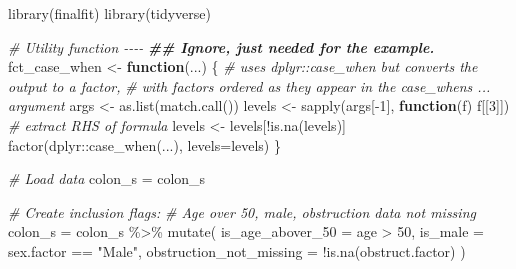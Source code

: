 \documentclass[
]{book}
\newenvironment{Shaded}{\begin{snugshade}}{\end{snugshade}}
\newcommand{\AttributeTok}[1]{\textcolor[rgb]{0.77,0.63,0.00}{#1}}
\newcommand{\CommentTok}[1]{\textcolor[rgb]{0.56,0.35,0.01}{\textit{#1}}}
\newcommand{\ControlFlowTok}[1]{\textcolor[rgb]{0.13,0.29,0.53}{\textbf{#1}}}
\newcommand{\DecValTok}[1]{\textcolor[rgb]{0.00,0.00,0.81}{#1}}
\newcommand{\DocumentationTok}[1]{\textcolor[rgb]{0.56,0.35,0.01}{\textbf{\textit{#1}}}}
\newcommand{\FunctionTok}[1]{\textcolor[rgb]{0.00,0.00,0.00}{#1}}
\newcommand{\NormalTok}[1]{#1}
\newcommand{\OtherTok}[1]{\textcolor[rgb]{0.56,0.35,0.01}{#1}}
\newcommand{\SpecialCharTok}[1]{\textcolor[rgb]{0.00,0.00,0.00}{#1}}
\newcommand{\StringTok}[1]{\textcolor[rgb]{0.31,0.60,0.02}{#1}}
\begin{document}
\begin{Shaded}
\begin{Highlighting}[]
\FunctionTok{library}\NormalTok{(finalfit)}
\FunctionTok{library}\NormalTok{(tidyverse)}

\CommentTok{\# Utility function {-}{-}{-}{-}}
\DocumentationTok{\#\# Ignore, just needed for the example. }
\NormalTok{fct\_case\_when }\OtherTok{\textless{}{-}} \ControlFlowTok{function}\NormalTok{(...) \{}
  \CommentTok{\# uses dplyr::case\_when but converts the output to a factor,}
  \CommentTok{\# with factors ordered as they appear in the case\_when\textquotesingle{}s  ... argument}
\NormalTok{  args }\OtherTok{\textless{}{-}} \FunctionTok{as.list}\NormalTok{(}\FunctionTok{match.call}\NormalTok{())}
\NormalTok{  levels }\OtherTok{\textless{}{-}} \FunctionTok{sapply}\NormalTok{(args[}\SpecialCharTok{{-}}\DecValTok{1}\NormalTok{], }\ControlFlowTok{function}\NormalTok{(f) f[[}\DecValTok{3}\NormalTok{]])  }\CommentTok{\# extract RHS of formula}
\NormalTok{  levels }\OtherTok{\textless{}{-}}\NormalTok{ levels[}\SpecialCharTok{!}\FunctionTok{is.na}\NormalTok{(levels)]}
  \FunctionTok{factor}\NormalTok{(dplyr}\SpecialCharTok{::}\FunctionTok{case\_when}\NormalTok{(...), }\AttributeTok{levels=}\NormalTok{levels)}
\NormalTok{\}}

\CommentTok{\# Load data}
\NormalTok{colon\_s }\OtherTok{=}\NormalTok{ colon\_s}

\CommentTok{\# Create inclusion flags:}
\CommentTok{\# Age over 50, male, obstruction data not missing}
\NormalTok{colon\_s }\OtherTok{=}\NormalTok{ colon\_s }\SpecialCharTok{\%\textgreater{}\%} 
  \FunctionTok{mutate}\NormalTok{(}
    \AttributeTok{is\_age\_abover\_50 =}\NormalTok{ age }\SpecialCharTok{\textgreater{}} \DecValTok{50}\NormalTok{,}
    \AttributeTok{is\_male =}\NormalTok{ sex.factor }\SpecialCharTok{==} \StringTok{"Male"}\NormalTok{,}
    \AttributeTok{obstruction\_not\_missing =} \SpecialCharTok{!}\FunctionTok{is.na}\NormalTok{(obstruct.factor)}
\NormalTok{  )}


\end{Highlighting}
\end{Shaded}
\end{document}
